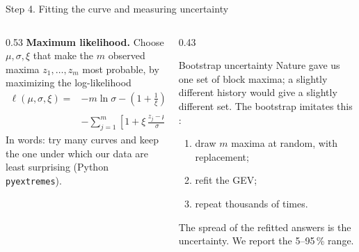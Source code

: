 \documentclass[aspectratio=169,11pt]{beamer}
\begin{document}
\begin{frame}{Step 4. Fitting the curve and measuring uncertainty}
  \begin{columns}[T]
    \begin{column}{0.53\textwidth}\footnotesize
      \textbf{Maximum likelihood.} Choose $\mu, \sigma, \xi$ that make the
      $m$ observed maxima $z_1, \dots, z_m$ most probable, by maximizing
      the log-likelihood \citep{Coles2001}
      \[
        \begin{aligned}
          \ell(\mu,\sigma,\xi) = &-m\ln\sigma
            - \left(1 + \tfrac{1}{\xi}\right)\sum_{j=1}^{m}
              \ln\!\left[1 + \xi\,\tfrac{z_j-\mu}{\sigma}\right] \\
          &- \sum_{j=1}^{m}
              \left[1 + \xi\,\tfrac{z_j-\mu}{\sigma}\right]^{-1/\xi}.
        \end{aligned}
      \]
      In words: try many curves and keep the one under which our data are
      least surprising (Python \texttt{pyextremes}).
    \end{column}
    \begin{column}{0.43\textwidth}
      \begin{block}{Bootstrap uncertainty}
        \footnotesize Nature gave us one set of block maxima; a slightly different
        history would give a slightly different set. The bootstrap imitates
        this \citep{Efron1979}:
        \begin{enumerate}\setlength{\itemsep}{1pt}
          \item draw $m$ maxima at random, with replacement;
          \item refit the GEV;
          \item repeat thousands of times.
        \end{enumerate}
        The spread of the refitted answers is the uncertainty. We report
        the 5--95\,\% range.
      \end{block}
    \end{column}
  \end{columns}
\end{frame}
\end{document}
